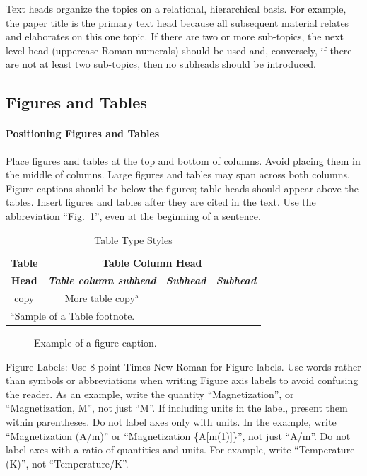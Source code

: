 \documentclass[conference]{IEEEtran}
\begin{document}
Text heads organize the topics on a relational, hierarchical basis. For 
example, the paper title is the primary text head because all subsequent 
material relates and elaborates on this one topic. If there are two or more 
sub-topics, the next level head (uppercase Roman numerals) should be used 
and, conversely, if there are not at least two sub-topics, then no subheads 
should be introduced.

\subsection{Figures and Tables}
\paragraph{Positioning Figures and Tables} Place figures and tables at the top and 
bottom of columns. Avoid placing them in the middle of columns. Large 
figures and tables may span across both columns. Figure captions should be 
below the figures; table heads should appear above the tables. Insert 
figures and tables after they are cited in the text. Use the abbreviation 
``Fig.~\ref{fig}'', even at the beginning of a sentence.

\begin{table}[htbp]
\caption{Table Type Styles}
\begin{center}
\begin{tabular}{|c|c|c|c|}
\hline
\textbf{Table}&\multicolumn{3}{|c|}{\textbf{Table Column Head}} \\
\cline{2-4} 
\textbf{Head} & \textbf{\textit{Table column subhead}}& \textbf{\textit{Subhead}}& \textbf{\textit{Subhead}} \\
\hline
copy& More table copy$^{\mathrm{a}}$& &  \\
\hline
\multicolumn{4}{l}{$^{\mathrm{a}}$Sample of a Table footnote.}
\end{tabular}
\label{tab1}
\end{center}
\end{table}

\begin{figure}[htbp]
\caption{Example of a figure caption.}
\label{fig}
\end{figure}

Figure Labels: Use 8 point Times New Roman for Figure labels. Use words 
rather than symbols or abbreviations when writing Figure axis labels to 
avoid confusing the reader. As an example, write the quantity 
``Magnetization'', or ``Magnetization, M'', not just ``M''. If including 
units in the label, present them within parentheses. Do not label axes only 
with units. In the example, write ``Magnetization (A/m)'' or ``Magnetization 
\{A[m(1)]\}'', not just ``A/m''. Do not label axes with a ratio of 
quantities and units. For example, write ``Temperature (K)'', not 
``Temperature/K''.
\end{document}
